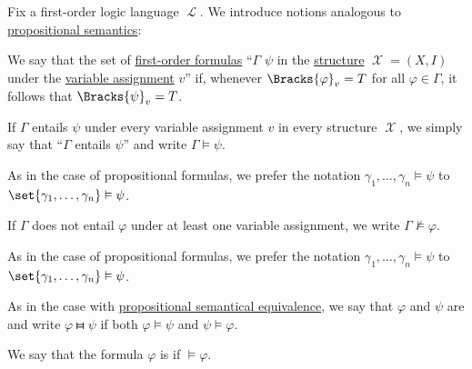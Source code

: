 \begin{definition}\label{def:first_order_semantics}
  Fix a first-order logic language \( \mscrL \). We introduce notions analogous to \hyperref[def:propositional_semantics]{propositional semantics}:
  \begin{thmenum}
     We say that the set of \hyperref[def:first_order_syntax/formula]{first-order formulas} \enquote{\( \Gamma \)  \( \psi \) in the \hyperref[def:first_order_structure]{structure} \( \mscrX = (X, I) \) under the \hyperref[def:first_order_valuation/variable_assignment]{variable assignment} \( v \)} if, whenever \( \Bracks{\varphi}_v = T \) for all \( \varphi \in \Gamma \), it follows that \( \Bracks{\psi}_v = T \).

     If \( \Gamma \) entails \( \psi \) under every variable assignment \( v \) in every structure \( \mscrX \), we simply say that \enquote{\( \Gamma \) entails \( \psi \)} and write \( \Gamma \vDash \psi \).

    As in the case of propositional formulas, we prefer the notation \( \gamma_1, \ldots, \gamma_n \vDash \psi \) to \( \set{ \gamma_1, \ldots, \gamma_n } \vDash \psi \).

    If \( \Gamma \) does not entail \( \varphi \) under at least one variable assignment, we write \( \Gamma \not\vDash \varphi \).

    As in the case of propositional formulas, we prefer the notation \( \gamma_1, \ldots, \gamma_n \vDash \psi \) to \( \set{ \gamma_1, \ldots, \gamma_n } \vDash \psi \).

     As in the case with \hyperref[def:propositional_semantics/equivalence]{propositional semantical equivalence}, we say that \( \varphi \) and \( \psi \) are  and write \( \varphi \gleichstark \psi \) if both \( \varphi \vDash \psi \) and \( \psi \vDash \varphi \).

     We say that the formula \( \varphi \) is  if \( \vDash \varphi \).
  \end{thmenum}
\end{definition}
